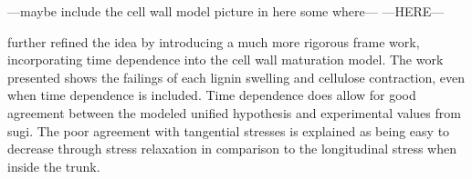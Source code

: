 ---maybe include the cell wall model picture in here some where---
---HERE---


\cite{Yamamoto_1998} further refined the idea by introducing a much more rigorous frame
work, incorporating time dependence into the cell wall maturation model. The
work presented shows the failings of each lignin swelling and cellulose
contraction, even when time dependence is included. Time dependence does allow
for good agreement between the modeled unified hypothesis and experimental
values from sugi. The poor agreement with tangential stresses is
explained as being easy to decrease through stress relaxation in comparison to
the longitudinal stress when inside the trunk.
